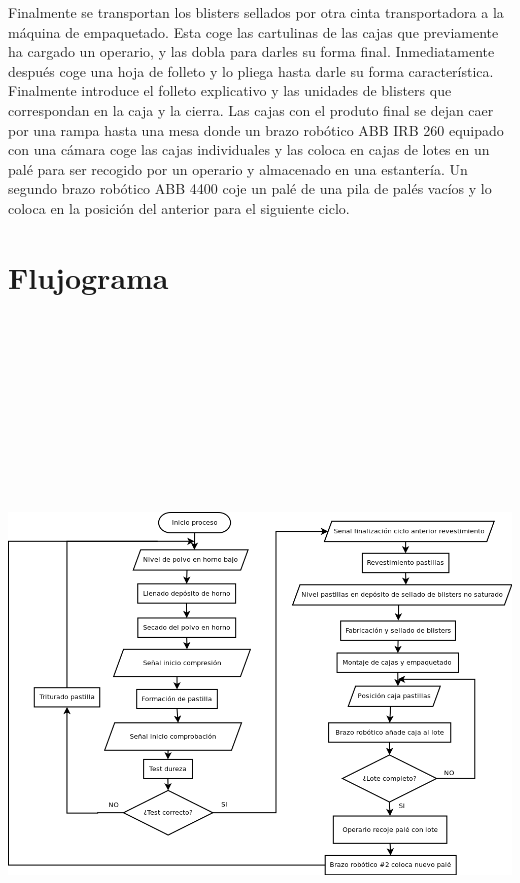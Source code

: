 Finalmente se transportan los blisters sellados por otra cinta transportadora a la máquina de empaquetado. Esta coge las cartulinas de las cajas que previamente ha cargado un operario, y las dobla para darles su forma final. Inmediatamente después coge una hoja de folleto y lo pliega hasta darle su forma característica. Finalmente introduce el folleto explicativo y las unidades de blisters que correspondan en la caja y la cierra. Las cajas con el produto final se dejan caer por una rampa hasta una mesa donde un brazo robótico ABB IRB 260 equipado con una cámara coge las cajas individuales y las coloca en cajas de lotes en un palé para ser recogido por un operario y almacenado en una estantería. Un segundo brazo robótico ABB 4400 coje un palé de una pila de palés vacíos y lo coloca en la posición del anterior para el siguiente ciclo.
\\
\section{Flujograma}
\includegraphics[width=15cm,height=20cm,keepaspectratio]{Planos/Flujograma.png}



